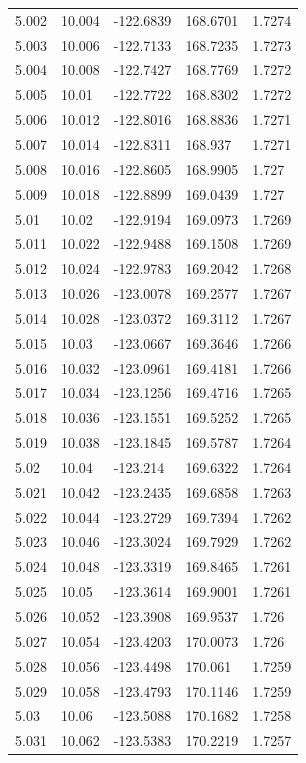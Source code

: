 \begin{tabular}{lllll}
5.002 & 10.004 & -122.6839 & 168.6701 & 1.7274 \\
5.003 & 10.006 & -122.7133 & 168.7235 & 1.7273 \\
5.004 & 10.008 & -122.7427 & 168.7769 & 1.7272 \\
5.005 & 10.01 & -122.7722 & 168.8302 & 1.7272 \\
5.006 & 10.012 & -122.8016 & 168.8836 & 1.7271 \\
5.007 & 10.014 & -122.8311 & 168.937 & 1.7271 \\
5.008 & 10.016 & -122.8605 & 168.9905 & 1.727 \\
5.009 & 10.018 & -122.8899 & 169.0439 & 1.727 \\
5.01 & 10.02 & -122.9194 & 169.0973 & 1.7269 \\
5.011 & 10.022 & -122.9488 & 169.1508 & 1.7269 \\
5.012 & 10.024 & -122.9783 & 169.2042 & 1.7268 \\
5.013 & 10.026 & -123.0078 & 169.2577 & 1.7267 \\
5.014 & 10.028 & -123.0372 & 169.3112 & 1.7267 \\
5.015 & 10.03 & -123.0667 & 169.3646 & 1.7266 \\
5.016 & 10.032 & -123.0961 & 169.4181 & 1.7266 \\
5.017 & 10.034 & -123.1256 & 169.4716 & 1.7265 \\
5.018 & 10.036 & -123.1551 & 169.5252 & 1.7265 \\
5.019 & 10.038 & -123.1845 & 169.5787 & 1.7264 \\
5.02 & 10.04 & -123.214 & 169.6322 & 1.7264 \\
5.021 & 10.042 & -123.2435 & 169.6858 & 1.7263 \\
5.022 & 10.044 & -123.2729 & 169.7394 & 1.7262 \\
5.023 & 10.046 & -123.3024 & 169.7929 & 1.7262 \\
5.024 & 10.048 & -123.3319 & 169.8465 & 1.7261 \\
5.025 & 10.05 & -123.3614 & 169.9001 & 1.7261 \\
5.026 & 10.052 & -123.3908 & 169.9537 & 1.726 \\
5.027 & 10.054 & -123.4203 & 170.0073 & 1.726 \\
5.028 & 10.056 & -123.4498 & 170.061 & 1.7259 \\
5.029 & 10.058 & -123.4793 & 170.1146 & 1.7259 \\
5.03 & 10.06 & -123.5088 & 170.1682 & 1.7258 \\
5.031 & 10.062 & -123.5383 & 170.2219 & 1.7257 \\

\end{tabular}
